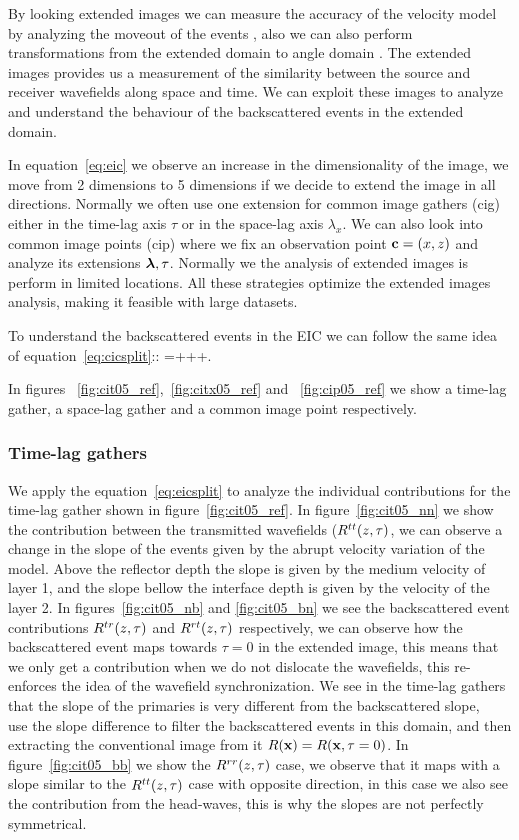 By looking extended images we can measure the accuracy of the velocity model by analyzing the moveout of the events
 \citep{yang:S151}, also we can also perform transformations from the extended domain to angle domain 
\citep{sava:S209,sava:S131}. The extended  images provides us a measurement of the similarity between the source
 and receiver wavefields along space and time.
 We can exploit these images to analyze and understand the behaviour of the backscattered events in the extended domain.

In equation~\ref{eq:eic} we observe an increase in the dimensionality of the image, we move from 2 dimensions to 5 dimensions
if we decide to extend the image in all directions. Normally we often use one extension for common image gathers (cig) either
in the time-lag axis $\tau$ or in the space-lag axis $\lambda_x$. We can also look into common image points (cip) where we 
fix an observation point ${\bf c}=(x,z)$ and analyze its extensions ${\boldsymbol{\lambda}},\tau$. Normally we the analysis of extended images 
is perform  in limited locations. All these strategies optimize the extended images analysis, making it feasible with 
large datasets.

To understand the backscattered events in the EIC we can follow the same idea of equation~\ref{eq:cicsplit}::
\beq
\Re=+++.
\label{eq:eicsplit}
\eeq

In figures ~\ref{fig:cit05_ref},~\ref{fig:citx05_ref} and ~\ref{fig:cip05_ref} we show a time-lag gather, a space-lag gather
 and a common image point respectively.

\subsubsection{Time-lag gathers}

We apply the equation~\ref{eq:eicsplit} to analyze the individual contributions
for the time-lag gather shown in figure~\ref{fig:cit05_ref}. In figure~\ref{fig:cit05_nn} we show the contribution between
the transmitted wavefields ($R^{tt}(z,\tau)$, we can observe a change in the slope of the events given by the abrupt velocity variation of the model. 
Above the reflector depth the slope is given by the medium velocity of layer 1, and the slope bellow the interface depth is given
 by the velocity of the layer 2. In figures~\ref{fig:cit05_nb} and \ref{fig:cit05_bn} we see the backscattered
 event contributions $R^{tr}(z,\tau)$ and $R^{rt}(z,\tau)$ respectively, we can observe how the backscattered event maps towards $\tau=0$
in the extended image, this means that we only get a contribution when we do not dislocate the wavefields, this re-enforces
the idea of the wavefield synchronization. We see in the time-lag gathers that the slope of the primaries is very different
from the backscattered slope, ~\cite{kaelin:3125} use the slope difference to filter the backscattered 
events in this domain, and then extracting the conventional image from it $R({\bf x})=R({\bf x},\tau=0)$. In figure~\ref{fig:cit05_bb} 
we show the $R^{rr}(z,\tau)$ case, we observe that it maps with a slope similar to the $R^{tt}(z,\tau)$ case with opposite direction, 
in this case we also see the contribution from the head-waves, this is why the slopes are not perfectly symmetrical.

